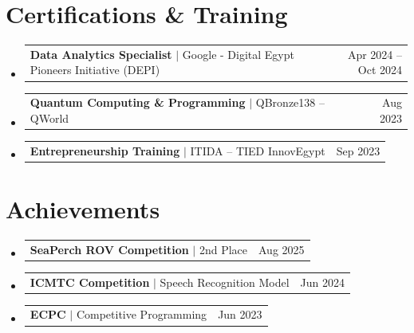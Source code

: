 \documentclass[letterpaper,11pt]{article}
\makeatletter
\newcommand{\resumeProjectHeading}[2]{
    \item
    \begin{tabular*}{0.97\textwidth}{l@{\extracolsep{\fill}}r}
      \small#1 & #2 \\
    \end{tabular*}\vspace{-7pt}
}
\newcommand{\resumeSubHeadingListStart}{\begin{itemize}[leftmargin=0.15in, label={}]}
\newcommand{\resumeSubHeadingListEnd}{\end{itemize}}
\makeatother
\begin{document}
\section{Certifications \& Training}
  \resumeSubHeadingListStart
    \resumeProjectHeading
        {\textbf{Data Analytics Specialist} $|$ Google - Digital Egypt Pioneers Initiative (DEPI)}{Apr 2024 -- Oct 2024}
    \resumeProjectHeading
        {\textbf{Quantum Computing \& Programming} $|$ QBronze138 -- QWorld}{Aug 2023}
    \resumeProjectHeading
        {\textbf{Entrepreneurship Training} $|$ ITIDA -- TIED InnovEgypt}{Sep 2023}
  \resumeSubHeadingListEnd

\section{Achievements}
  \resumeSubHeadingListStart
    \resumeProjectHeading
        {\textbf{SeaPerch ROV Competition} $|$ 2nd Place}{Aug 2025}
    \resumeProjectHeading
        {\textbf{ICMTC Competition} $|$ Speech Recognition Model}{Jun 2024}
    \resumeProjectHeading
        {\textbf{ECPC} $|$ Competitive Programming}{Jun 2023}
  \resumeSubHeadingListEnd
\end{document}

